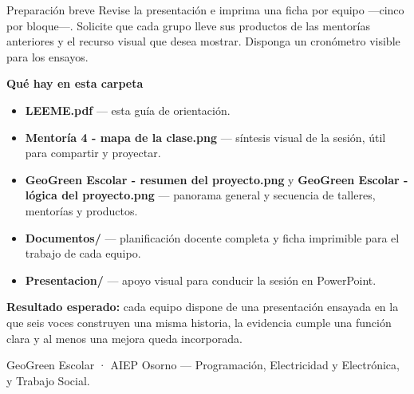 \documentclass[9pt,a4paper]{article}
\begin{document}
\begin{softbox}{Preparación breve}
Revise la presentación e imprima una ficha por equipo —cinco por bloque—. Solicite que cada grupo lleve sus productos de las mentorías anteriores y el recurso visual que desea mostrar. Disponga un cronómetro visible para los ensayos.
\end{softbox}

{\bfseries\color{AIEPNavy}Qué hay en esta carpeta}\par
\begin{itemize}
  \item \textbf{LEEME.pdf} — esta guía de orientación.
  \item \textbf{Mentoría 4 - mapa de la clase.png} — síntesis visual de la sesión, útil para compartir y proyectar.
  \item \textbf{GeoGreen Escolar - resumen del proyecto.png} y \textbf{GeoGreen Escolar - lógica del proyecto.png} — panorama general y secuencia de talleres, mentorías y productos.
  \item \textbf{Documentos/} — planificación docente completa y ficha imprimible para el trabajo de cada equipo.
  \item \textbf{Presentacion/} — apoyo visual para conducir la sesión en PowerPoint.
\end{itemize}

\begin{tcolorbox}[colback=AIEPNavy,colframe=AIEPNavy,coltext=white,boxrule=0pt,arc=1mm,left=3mm,right=3mm,top=1.8mm,bottom=1.8mm,before skip=3pt]
\textbf{Resultado esperado:} cada equipo dispone de una presentación ensayada en la que seis voces construyen una misma historia, la evidencia cumple una función clara y al menos una mejora queda incorporada.
\end{tcolorbox}

\vfill
{\footnotesize\color{AIEPMuted}GeoGreen Escolar · AIEP Osorno — Programación, Electricidad y Electrónica, y Trabajo Social.}
\end{document}
